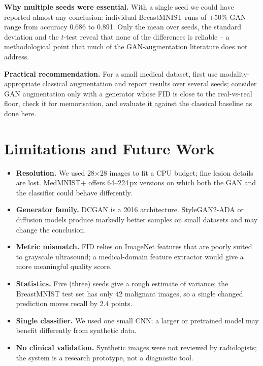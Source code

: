 \textbf{Why multiple seeds were essential.} With a single seed we could have reported almost any conclusion: individual
BreastMNIST runs of +50\% GAN range from accuracy 0.686 to 0.891. Only the mean over seeds, the standard deviation and the
$t$-test reveal that none of the differences is reliable -- a methodological point that much of the GAN-augmentation
literature does not address.

\textbf{Practical recommendation.} For a small medical dataset, first use modality-appropriate classical augmentation and
report results over several seeds; consider GAN augmentation only with a generator whose FID is close to the real-vs-real
floor, check it for memorisation, and evaluate it against the classical baseline as done here.

\section{Limitations and Future Work}
\begin{itemize}
  \item \textbf{Resolution.} We used 28$\times$28 images to fit a CPU budget; fine lesion details are lost. MedMNIST+ offers
        64--224\,px versions on which both the GAN and the classifier could behave differently.
  \item \textbf{Generator family.} DCGAN is a 2016 architecture. StyleGAN2-ADA or diffusion models produce markedly better
        samples on small datasets and may change the conclusion.
  \item \textbf{Metric mismatch.} FID relies on ImageNet features that are poorly suited to grayscale ultrasound; a
        medical-domain feature extractor would give a more meaningful quality score.
  \item \textbf{Statistics.} Five (three) seeds give a rough estimate of variance; the BreastMNIST test set has only
        42 malignant images, so a single changed prediction moves recall by 2.4 points.
  \item \textbf{Single classifier.} We used one small CNN; a larger or pretrained model may benefit differently from
        synthetic data.
  \item \textbf{No clinical validation.} Synthetic images were not reviewed by radiologists; the system is a research
        prototype, not a diagnostic tool.
\end{itemize}

